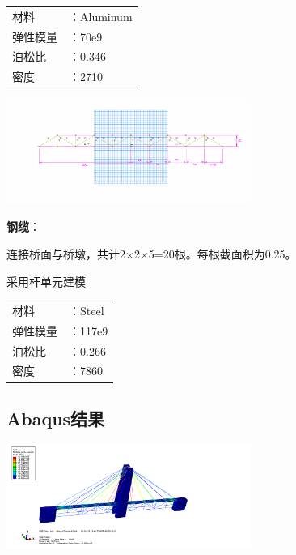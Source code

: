 \documentclass[UTF8]{ctexbook}
\begin{document}
\begin{center}
\begin{tabular}{ll}
材料&：Aluminum\\
弹性模量&：70e9\\
泊松比&：0.346\\
密度&：2710\\
\end{tabular}
\end{center}
\begin{center}
\includegraphics[width=0.6\textwidth]{04.png}
\end{center}

\textbf{钢缆}：

连接桥面与桥墩，共计2×2×5=20根。每根截面积为0.25。

采用杆单元建模

\begin{center}
\begin{tabular}{ll}
材料&：Steel\\
弹性模量&：117e9\\
泊松比&：0.266\\
密度&：7860\\
\end{tabular}
\end{center}

\subsection{Abaqus结果}

\begin{center}
\includegraphics[width=0.6\textwidth]{05.png}
\end{center}


\end{document}
